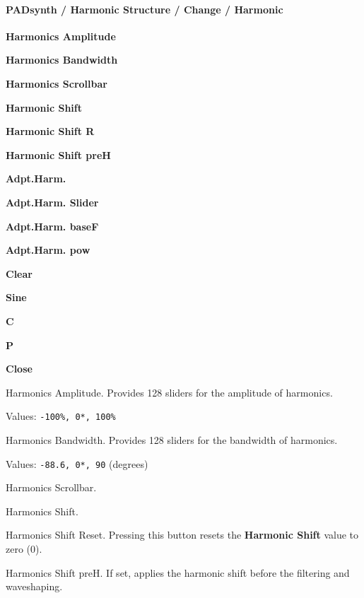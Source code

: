 \paragraph{PADsynth / Harmonic Structure / Change / Harmonic}
\label{paragraph:padsynth_harmonic_structure_change_harmonic}

   \begin{enumber}
      \item \textbf{Harmonics Amplitude}
      \item \textbf{Harmonics Bandwidth}
      \item \textbf{Harmonics Scrollbar}
      \item \textbf{Harmonic Shift}
      \item \textbf{Harmonic Shift R}
      \item \textbf{Harmonic Shift preH}
      \item \textbf{Adpt.Harm.}
      \item \textbf{Adpt.Harm. Slider}
      \item \textbf{Adpt.Harm. baseF}
      \item \textbf{Adpt.Harm. pow}
      \item \textbf{Clear}
      \item \textbf{Sine}
      \item \textbf{C}
      \item \textbf{P}
      \item \textbf{Close}
   \end{enumber}

   Harmonics Amplitude.
   Provides 128 sliders for the amplitude of harmonics.

   Values: \texttt{-100\%, 0*, 100\%}

   Harmonics Bandwidth.
   Provides 128 sliders for the bandwidth of harmonics.

   Values: \texttt{-88.6, 0*, 90} (degrees)

   Harmonics Scrollbar.

   Harmonics Shift.

   Harmonics Shift Reset.
   Pressing this button resets the \textbf{Harmonic Shift} value to zero
   (0).

   Harmonics Shift preH.
   If set, applies the harmonic shift before the filtering and waveshaping.

